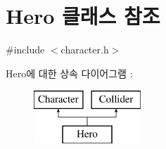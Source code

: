 \hypertarget{class_hero}{\section{\-Hero 클래스 참조}
\label{class_hero}
}


{\ttfamily \#include $<$character.\-h$>$}

\-Hero에 대한 상속 다이어그램 \-: \begin{figure}[H]
\begin{center}
\leavevmode
\includegraphics[height=2.000000cm]{class_hero}
\end{center}
\end{figure}
